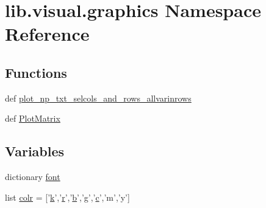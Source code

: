\hypertarget{a00152}{\section{lib.\+visual.\+graphics Namespace Reference}
\label{a00152}
}
\subsection*{Functions}
\begin{DoxyCompactItemize}
\item 
def \hyperlink{a00152_aa27c34e948992165c7a98e5ca3605549}{plot\+\_\+np\+\_\+txt\+\_\+selcols\+\_\+and\+\_\+rows\+\_\+allvarinrows}
\item 
def \hyperlink{a00152_a99e047c066345a973bfbb527e8a91085}{Plot\+Matrix}
\end{DoxyCompactItemize}
\subsection*{Variables}
\begin{DoxyCompactItemize}
\item 
dictionary \hyperlink{a00152_a3c83ccb4d4d1fcb0ea5f6b8616a1d0df}{font}
\item 
list \hyperlink{a00152_aae94b6a9df961a260c0fa476e2b4693a}{colr} = \mbox{[}'\hyperlink{a00110_abf70355c2e58f64c6b18bda1b9bccfd7}{k}','\hyperlink{a00031_ac862e7284527eb913b1351c8bfb8e079}{r}','\hyperlink{a00035_a50b4f3ddde10830a3976c71083aaee3f}{b}','g','\hyperlink{a00035_a6be92348ba85ef257b11d06209e1d7b6}{c}','m','y'\mbox{]}
\end{DoxyCompactItemize}



